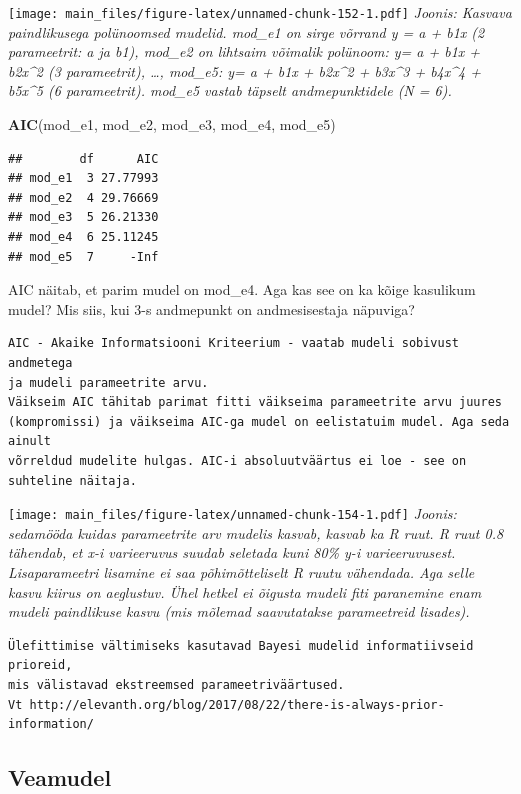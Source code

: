\documentclass[]{book}
\newenvironment{Shaded}{\begin{snugshade}}{\end{snugshade}}
\newcommand{\KeywordTok}[1]{\textcolor[rgb]{0.13,0.29,0.53}{\textbf{#1}}}
\newcommand{\NormalTok}[1]{#1}
\begin{document}
\texttt{[image: main\_files/figure-latex/unnamed-chunk-152-1.pdf]}
\emph{Joonis: Kasvava paindlikusega polünoomsed mudelid. mod\_e1 on
sirge võrrand y = a + b1x (2 parameetrit: a ja b1), mod\_e2 on lihtsaim
võimalik polünoom: y= a + b1x + b2x\^{}2 (3 parameetrit), \ldots{},
mod\_e5: y= a + b1x + b2x\^{}2 + b3x\^{}3 + b4x\^{}4 + b5x\^{}5 (6
parameetrit). mod\_e5 vastab täpselt andmepunktidele (N = 6).}

\begin{Shaded}
\begin{Highlighting}[]
\KeywordTok{AIC}\NormalTok{(mod_e1, mod_e2, mod_e3, mod_e4, mod_e5)}
\end{Highlighting}
\end{Shaded}

\begin{verbatim}
##        df      AIC
## mod_e1  3 27.77993
## mod_e2  4 29.76669
## mod_e3  5 26.21330
## mod_e4  6 25.11245
## mod_e5  7     -Inf
\end{verbatim}

AIC näitab, et parim mudel on mod\_e4. Aga kas see on ka kõige kasulikum
mudel? Mis siis, kui 3-s andmepunkt on andmesisestaja näpuviga?

\begin{verbatim}
AIC - Akaike Informatsiooni Kriteerium - vaatab mudeli sobivust andmetega
ja mudeli parameetrite arvu. 
Väikseim AIC tähitab parimat fitti väikseima parameetrite arvu juures
(kompromissi) ja väikseima AIC-ga mudel on eelistatuim mudel. Aga seda ainult
võrreldud mudelite hulgas. AIC-i absoluutväärtus ei loe - see on suhteline näitaja.  
\end{verbatim}

\texttt{[image: main\_files/figure-latex/unnamed-chunk-154-1.pdf]}
\emph{Joonis: sedamööda kuidas parameetrite arv mudelis kasvab, kasvab
ka R ruut. R ruut 0.8 tähendab, et x-i varieeruvus suudab seletada kuni
80\% y-i varieeruvusest. Lisaparameetri lisamine ei saa põhimõtteliselt
R ruutu vähendada. Aga selle kasvu kiirus on aeglustuv. Ühel hetkel ei
õigusta mudeli fiti paranemine enam mudeli paindlikuse kasvu (mis
mõlemad saavutatakse parameetreid lisades).}

\begin{verbatim}
Ülefittimise vältimiseks kasutavad Bayesi mudelid informatiivseid prioreid, 
mis välistavad ekstreemsed parameetriväärtused. 
Vt http://elevanth.org/blog/2017/08/22/there-is-always-prior-information/ 
\end{verbatim}

\subsection{Veamudel}\label{veamudel}
\end{document}
